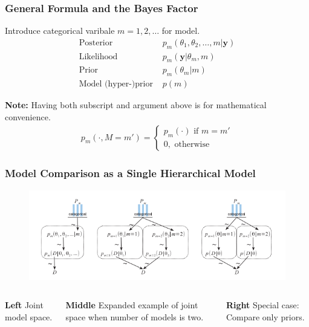 \documentclass[usenames,dvipsnames,table]{beamer}
\begin{document}
\begin{frame}
\frametitle{General Formula and the Bayes Factor}
Introduce categorical varibale $m={1, 2, \ldots}$ for model.
\begin{align*}
\text{Posterior }           & p_m(\theta_1, \theta_2, \ldots, m|\mathbf{y}) \\
\text{Likelihood }          & p_m(\mathbf{y}| \theta_m, m) \\
\text{Prior }               & p_m(\theta_m| m) \\
\text{Model (hyper-)prior } & p(m)
\end{align*}

\textbf{Note:} Having both subscript and argument above is for mathematical
               convenience.
\begin{align*}
p_m(\cdot, M=m') =
    \begin{cases}
    p_m(\cdot) \text{ if } m = m' \\
    0, \text{ otherwise}
    \end{cases}
\end{align*}
\end{frame}




\begin{frame}
\frametitle{Model Comparison as a Single Hierarchical Model}
\begin{figure}
\centering
\includegraphics[width=\textwidth]{img/fig10_1}
\end{figure}
\begin{columns}[t]
\textbf{Left}
Joint model space.

\textbf{Middle}
Expanded example of joint space when number of models is two.

\textbf{Right}
Special case: Compare only priors.
\end{columns}
\end{frame}
\end{document}
